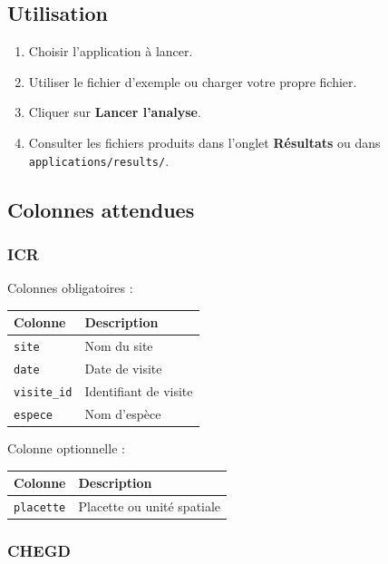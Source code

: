 \documentclass[11pt,a4paper]{article}
\providecommand{\tightlist}{\setlength{\itemsep}{0pt}\setlength{\parskip}{0pt}}
\begin{document}
\subsection{Utilisation}\label{utilisation}

\begin{enumerate}
\def\labelenumi{\arabic{enumi}.}
\tightlist
\item
  Choisir l'application à lancer.
\item
  Utiliser le fichier d'exemple ou charger votre propre fichier.
\item
  Cliquer sur \textbf{Lancer l'analyse}.
\item
  Consulter les fichiers produits dans l'onglet \textbf{Résultats} ou
  dans \texttt{applications/results/}.
\end{enumerate}

\subsection{Colonnes attendues}\label{colonnes-attendues}

\subsubsection{ICR}\label{icr}

Colonnes obligatoires :

{%
\begin{longtable}[]{@{}ll@{}}
\toprule\noalign{}
Colonne & Description \\
\midrule\noalign{}
\endhead
\bottomrule\noalign{}
\endlastfoot
\texttt{site} & Nom du site \\
\texttt{date} & Date de visite \\
\texttt{visite\_id} & Identifiant de visite \\
\texttt{espece} & Nom d'espèce \\
\end{longtable}
}

Colonne optionnelle :

{%
\begin{longtable}[]{@{}ll@{}}
\toprule\noalign{}
Colonne & Description \\
\midrule\noalign{}
\endhead
\bottomrule\noalign{}
\endlastfoot
\texttt{placette} & Placette ou unité spatiale \\
\end{longtable}
}

\subsubsection{CHEGD}\label{chegd}
\end{document}
